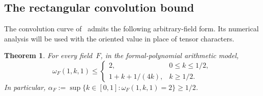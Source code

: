 \documentclass[11pt,letterpaper]{article}
\newtheorem{theorem}{Theorem}[section]
\theoremstyle{definition}
\numberwithin{equation}{section}
\begin{document}
\subsection{The rectangular convolution bound}\label{sec:rectangular-convolution}

The convolution curve of~\cite[Corollary 1.2]{Uznanski26} admits the following arbitrary-field form. Its numerical analysis will be used with the oriented value in place of tensor characters.

\begin{theorem}\label{thm:rectangular}
For every field~$F$, in the formal-polynomial arithmetic model,
\begin{equation}\label{eq:rectangular-curve}
 \omega_F(1,k,1)\leq
 \begin{cases}
 2,&0\leq k\leq1/2,\\
 1+k+1/(4k),&k\geq1/2.
 \end{cases}
\end{equation}
In particular, $\alpha_F:=\sup\{k\in[0,1]:\omega_F(1,k,1)=2\}\geq1/2$.
\end{theorem}
\end{document}
